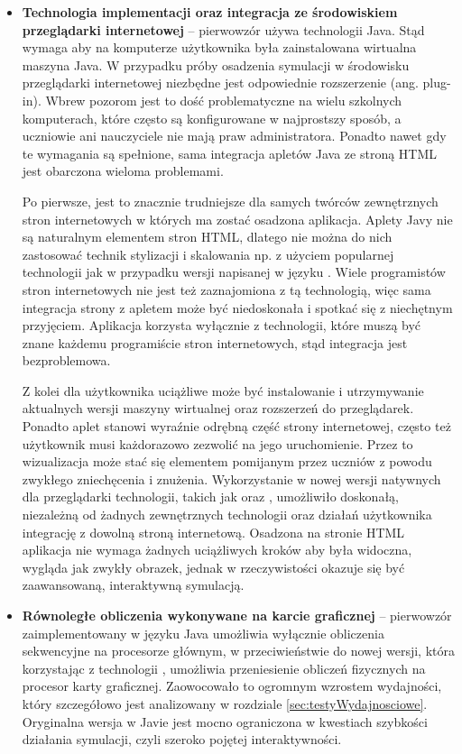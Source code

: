 \begin{itemize}

\item \textbf{Technologia implementacji oraz integracja ze środowiskiem
przeglądarki internetowej} -- pierwowzór używa technologii Java. Stąd wymaga aby
na komputerze użytkownika była zainstalowana wirtualna maszyna Java. W przypadku
próby osadzenia symulacji w środowisku przeglądarki internetowej niezbędne jest
odpowiednie rozszerzenie (ang. plug-in). Wbrew pozorom jest to dość
problematyczne na wielu szkolnych komputerach, które często są konfigurowane w
najprostszy sposób, a uczniowie ani nauczyciele nie mają praw administratora.
Ponadto nawet gdy te wymagania są spełnione, sama integracja apletów Java ze
stroną HTML jest obarczona wieloma problemami.

Po pierwsze, jest to znacznie trudniejsze dla samych twórców zewnętrznych stron
internetowych w których ma zostać osadzona aplikacja. Aplety Javy nie są
naturalnym elementem stron HTML, dlatego nie można do nich zastosować technik
stylizacji i skalowania np. z użyciem popularnej technologii  jak w
przypadku wersji \en napisanej w języku \js. Wiele programistów stron
internetowych nie jest też zaznajomiona z tą technologią, więc sama integracja
strony z apletem może być niedoskonała i spotkać się z niechętnym przyjęciem.
Aplikacja \en \js korzysta wyłącznie z technologii, które muszą być znane
każdemu programiście stron internetowych, stąd integracja jest bezproblemowa.

Z kolei dla użytkownika uciążliwe może być instalowanie i utrzymywanie
aktualnych wersji maszyny wirtualnej  oraz rozszerzeń do przeglądarek.
Ponadto aplet stanowi wyraźnie odrębną część strony internetowej, często też
użytkownik musi każdorazowo zezwolić na jego uruchomienie. Przez to wizualizacja
może stać się elementem pomijanym przez uczniów z powodu zwykłego zniechęcenia i
znużenia. Wykorzystanie w nowej wersji natywnych dla przeglądarki technologii,
takich jak \js oraz , umożliwiło doskonałą, niezależną od żadnych
zewnętrznych technologii oraz działań użytkownika integrację z dowolną stroną
internetową. Osadzona na stronie HTML aplikacja nie wymaga żadnych uciążliwych
kroków aby była widoczna, wygląda jak zwykły obrazek, jednak w rzeczywistości
okazuje się być zaawansowaną, interaktywną symulacją.

\item \textbf{Równoległe obliczenia wykonywane na karcie graficznej} --
pierwowzór zaimplementowany w języku Java umożliwia wyłącznie obliczenia
sekwencyjne na procesorze głównym, w przeciwieństwie do nowej wersji, która
korzystając z technologii , umożliwia przeniesienie obliczeń
fizycznych na procesor karty graficznej. Zaowocowało to ogromnym wzrostem
wydajności, który szczegółowo jest analizowany w rozdziale
\ref{sec:testyWydajnosciowe}. Oryginalna wersja w Javie jest mocno ograniczona w
kwestiach szybkości działania symulacji, czyli szeroko pojętej interaktywności.


\end{itemize}
